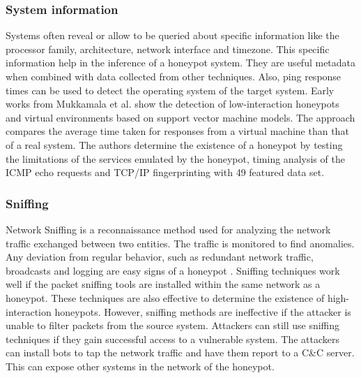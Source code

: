 \subsubsection{System information}
Systems often reveal or allow to be queried about specific information like the processor family, architecture, network interface and timezone. This specific information help in the inference of a honeypot system. They are useful metadata when combined with data collected from other techniques.  Also, ping response times can be used to detect the operating system of the target system. Early works from Mukkamala et al. \cite{mukkamala} show the detection of low-interaction honeypots and virtual environments based on support vector machine models. The approach compares the average time taken for responses from a virtual machine than that of a real system. The authors determine the existence of a honeypot by testing the limitations of the services emulated by the honeypot, timing analysis of the ICMP echo requests and TCP/IP fingerprinting with 49 featured data set.  
\newline
\subsubsection{Sniffing}
Network Sniffing is a reconnaissance method used for analyzing the network traffic exchanged between two entities. The traffic is monitored to find anomalies. Any deviation from regular behavior, such as redundant network traffic, broadcasts and logging are easy signs of a honeypot . Sniffing techniques work well if the packet sniffing tools are installed within the same network as a honeypot. These techniques are also effective to determine the existence of high-interaction honeypots. However, sniffing methods are ineffective if the attacker is unable to filter packets from the source system. Attackers can still use sniffing techniques if they gain successful access to a vulnerable system. The attackers can install bots to tap the network traffic and have them report to a C\&C  server. This can expose other systems in the network of the honeypot. 

